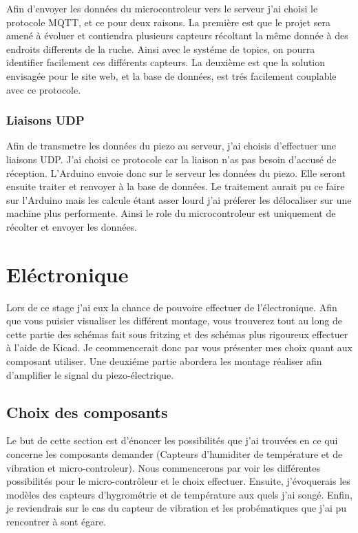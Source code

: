 \documentclass[12pt,french,a4paper]{article}
\begin{document}
Afin d'envoyer les données du microcontroleur vers le serveur j'ai choisi le protocole MQTT, et ce pour deux raisons. La première est que le projet sera amené à évoluer et contiendra plusieurs capteurs récoltant la même donnée à des endroits differents de la ruche. Ainsi avec le systéme de topics, on pourra identifier facilement ces différents capteurs. La deuxième est que la solution envisagée pour le site web, et la base de données, est trés facilement couplable avec ce protocole. 

\subsubsection{Liaisons UDP}
Afin de transmetre les données du piezo au serveur, j'ai choisis d'effectuer une liaisons UDP. J'ai choisi ce protocole car la liaison n'as pas besoin d'accusé de réception. L'Arduino envoie donc sur le serveur les données du piezo.
Elle seront ensuite traiter et renvoyer à la base de données. 
Le traitement aurait pu ce faire sur l'Arduino mais les calcule étant asser lourd j'ai préferer les délocaliser sur une machine plus performente. Ainsi le role du microcontroleur est uniquement de récolter et envoyer les données. 

\section{Eléctronique}
Lors de ce stage j'ai eux la chance de pouvoire effectuer de l'électronique. Afin que vous puisier visualiser les différent montage, vous trouverez tout au long de cette partie des schémas fait sous fritzing et des schémas plus rigoureux effectuer à l'aide de Kicad. Je ceommencerait donc par vous présenter mes choix quant aux composant utiliser. Une deuxiéme partie abordera les montage réaliser afin d'amplifier le signal du piezo-électrique.
\subsection{Choix des composants}

Le but de cette section est d'énoncer les possibilités que j'ai trouvées en ce qui concerne les composants demander (Capteurs d'humiditer de température et de vibration et micro-controleur). Nous commencerons par voir les différentes possibilités pour le micro-contrôleur et le choix effectuer. Ensuite, j'évoquerais les modèles des capteurs d'hygrométrie et de température aux quels j'ai songé. Enfin, je reviendrais sur le cas du capteur de vibration et les probématiques que j'ai pu rencontrer à sont égare.
\end{document}
